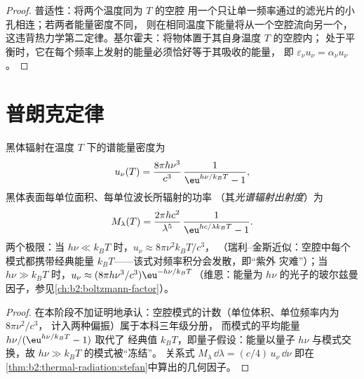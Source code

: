 \begin{proof}
普适性：将两个温度同为 $T$ 的空腔
用一个只让单一频率通过的滤光片的小孔相连；若两者能量密度不同，
则在相同温度下能量将从一个空腔流向另一个，
这违背热力学第二定律。基尔霍夫：将物体置于其自身温度 $T$ 的空腔内；
处于平衡时，它在每个频率上发射的能量必须恰好等于其吸收的能量，
即 $\varepsilon_\nu u_\nu = \alpha_\nu u_\nu$。
\end{proof}

\section{普朗克定律}

\begin{theorem}[普朗克定律]\label{thm:b2:thermal-radiation:planck}
黑体辐射在温度
$T$ 下的谱能量密度为
\[
u_\nu(T) = \frac{8\pi h\nu^3}{c^3}\,\frac{1}{\eu^{h\nu/k_BT} - 1},
\]
黑体表面每单位面积、每单位波长所辐射的功率
（其\emph{光谱辐射出射度}）为
\[
M_\lambda(T) = \frac{2\pi hc^2}{\lambda^5}\,\frac{1}{\eu^{hc/\lambda k_BT} - 1}.
\]
两个极限：当 $h\nu \ll k_BT$ 时，$u_\nu \approx 8\pi\nu^2 k_BT/c^3$，
（瑞利–金斯近似：空腔中每个模式都携带经典能量
$k_BT$——该式对频率积分会发散，即“紫外
灾难”）；当 $h\nu \gg k_BT$ 时，$u_\nu \approx (8\pi h\nu^3/c^3)
\eu^{-h\nu/k_BT}$（维恩：能量为
$h\nu$ 的光子的玻尔兹曼因子，参见\cref{ch:b2:boltzmann-factor}）。
\end{theorem}

\begin{proof}
在本阶段不加证明地承认：空腔模式的计数（单位体积、单位频率内为 $8\pi\nu^2/c^3$，
计入两种偏振）属于本科三年级分册，
而模式的平均能量 $h\nu/(\eu^{h\nu/k_BT} - 1)$ 取代了
经典值 $k_BT$，即量子假设：能量以量子
$h\nu$ 与模式交换，故 $h\nu \gg k_BT$ 的模式被“冻结”。
关系式 $M_\lambda\,\dd\lambda = (c/4)\,u_\nu\,\dd\nu$
即在\cref{thm:b2:thermal-radiation:stefan}中算出的几何因子。
\end{proof}

